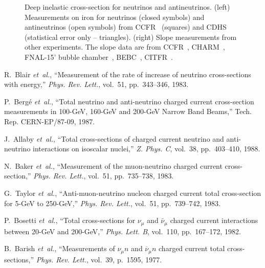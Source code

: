 \documentclass[a4paper,10pt]{article}
\begin{document}
\begin{figure}[htb]
	\caption{Deep inelastic cross-section for neutrinos and antineutrinos.
	(left) Measurements on iron for neutrinos (closed symbols) and
	antineutrinos (open symbols) from CCFR~\cite{Blair:1983su} (squares) and CDHS~\cite{Berge:1987zw} (statistical error only -- triangles).
	(right) Slope measurements from other experiments.
	The slope data are from CCFR~\cite{Blair:1983su},
	CHARM~\cite{Allaby:1987bb},
	FNAL-15' bubble chamber~\cite{Baker:1982jf,Taylor:1983qj},
	BEBC~\cite{Bosetti:1981ip},
	CITFR~\cite{Barish:1977ny}.
	}
\end{figure}
%
%
\begin{thebibliography}{99}
R.~Blair {\em et~al.}, ``Measurement of the rate of increase of neutrino
  cross-sections with energy,'' {\em Phys. Rev. Lett.}, vol.~51, pp.~343--346,
  1983.

P.~Bergé {\em et~al.}, ``Total neutrino and anti-neutrino charged current
  cross-section measurements in {100-GeV, 160-GeV and 200-GeV Narrow Band
  Beams},'' Tech. Rep. CERN-EP/87-09, 1987.

J.~Allaby {\em et~al.}, ``Total cross-sections of charged current neutrino and
  anti-neutrino interactions on isoscalar nuclei,'' {\em Z. Phys. C}, vol.~38,
  pp.~403--410, 1988.

N.~Baker {\em et~al.}, ``Measurement of the muon-neutrino charged current
  cross-section,'' {\em Phys. Rev. Lett.}, vol.~51, pp.~735--738, 1983.

G.~Taylor {\em et~al.}, ``Anti-muon-neutrino nucleon charged current total
  cross-section for {5-GeV to 250-GeV},'' {\em Phys. Rev. Lett.}, vol.~51,
  pp.~739--742, 1983.

P.~Bosetti {\em et~al.}, ``Total cross-sections for $\nu_\mu$ and
  $\bar{\nu}_\mu$ charged current interactions between {20-GeV and 200-GeV},''
  {\em Phys. Lett. B}, vol.~110, pp.~167--172, 1982.

B.~Barish {\em et~al.}, ``Measurements of
  ${\ensuremath{\nu}}_{\ensuremath{\mu}}n$ and
  ${\overline{\ensuremath{\nu}}}_{\ensuremath{\mu}}n$ charged current total
  cross-sections,'' {\em Phys. Rev. Lett.}, vol.~39, p.~1595, 1977.
\end{thebibliography}
\end{document}
